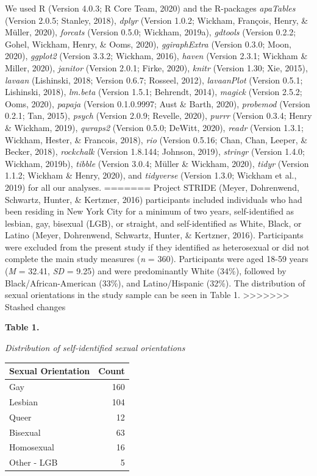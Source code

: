 \documentclass[
  english,
  man,floatsintext]{apa6}
\begin{document}
We used R (Version 4.0.3; R Core Team, 2020) and the R-packages \emph{apaTables} (Version 2.0.5; Stanley, 2018), \emph{dplyr} (Version 1.0.2; Wickham, François, Henry, \& Müller, 2020), \emph{forcats} (Version 0.5.0; Wickham, 2019a), \emph{gdtools} (Version 0.2.2; Gohel, Wickham, Henry, \& Ooms, 2020), \emph{ggiraphExtra} (Version 0.3.0; Moon, 2020), \emph{ggplot2} (Version 3.3.2; Wickham, 2016), \emph{haven} (Version 2.3.1; Wickham \& Miller, 2020), \emph{janitor} (Version 2.0.1; Firke, 2020), \emph{knitr} (Version 1.30; Xie, 2015), \emph{lavaan} (Lishinski, 2018; Version 0.6.7; Rosseel, 2012), \emph{lavaanPlot} (Version 0.5.1; Lishinski, 2018), \emph{lm.beta} (Version 1.5.1; Behrendt, 2014), \emph{magick} (Version 2.5.2; Ooms, 2020), \emph{papaja} (Version 0.1.0.9997; Aust \& Barth, 2020), \emph{probemod} (Version 0.2.1; Tan, 2015), \emph{psych} (Version 2.0.9; Revelle, 2020), \emph{purrr} (Version 0.3.4; Henry \& Wickham, 2019), \emph{qwraps2} (Version 0.5.0; DeWitt, 2020), \emph{readr} (Version 1.3.1; Wickham, Hester, \& Francois, 2018), \emph{rio} (Version 0.5.16; Chan, Chan, Leeper, \& Becker, 2018), \emph{rockchalk} (Version 1.8.144; Johnson, 2019), \emph{stringr} (Version 1.4.0; Wickham, 2019b), \emph{tibble} (Version 3.0.4; Müller \& Wickham, 2020), \emph{tidyr} (Version 1.1.2; Wickham \& Henry, 2020), and \emph{tidyverse} (Version 1.3.0; Wickham et al., 2019) for all our analyses.
=======
Project STRIDE (Meyer, Dohrenwend, Schwartz, Hunter, \& Kertzner, 2016) participants included individuals who had been residing in New York City for a minimum of two years, self-identified as lesbian, gay, bisexual (LGB), or straight, and self-identified as White, Black, or Latino (Meyer, Dohrenwend, Schwartz, Hunter, \& Kertzner, 2016). Participants were excluded from the present study if they identified as heterosexual or did not complete the main study measures (\emph{n} = 360). Participants were aged 18-59 years (\emph{M} = 32.41, \emph{SD} = 9.25) and were predominantly White (34\%), followed by Black/African-American (33\%), and Latino/Hispanic (32\%). The distribution of sexual orientations in the study sample can be seen in Table 1.
>>>>>>> Stashed changes

\textbf{Table 1.}

\emph{Distribution of self-identified sexual orientations}

\begin{tabular}{l|r}
\hline
Sexual Orientation & Count\\
\hline
Gay & 160\\
\hline
Lesbian & 104\\
\hline
Queer & 12\\
\hline
Bisexual & 63\\
\hline
Homosexual & 16\\
\hline
Other - LGB & 5\\
\hline
\end{tabular}
\end{document}

